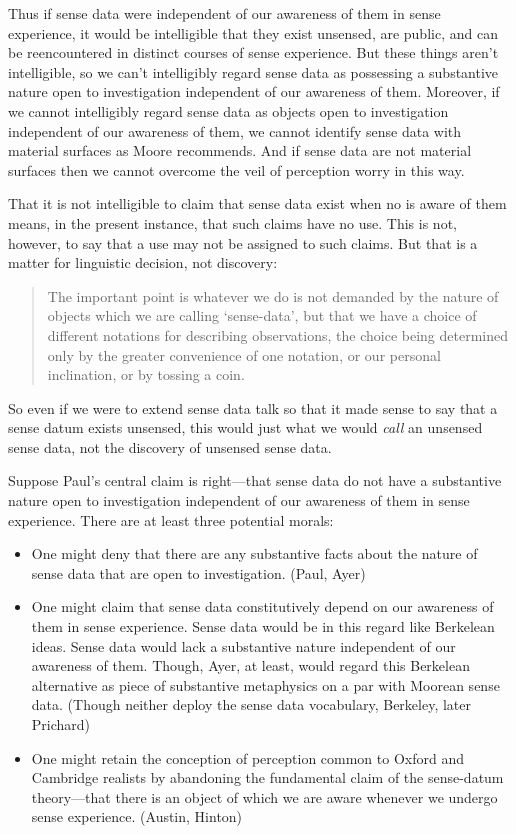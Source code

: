 Thus if sense data were independent of our awareness of them in sense experience, it would be intelligible that they exist unsensed, are public, and can be reencountered in distinct courses of sense experience. But these things aren't intelligible, so we can't intelligibly regard sense data as possessing a substantive nature open to investigation independent of our awareness of them. Moreover, if we cannot intelligibly regard sense data as objects open to investigation independent of our awareness of them, we cannot identify sense data with material surfaces as Moore recommends. And if sense data are not material surfaces then we cannot overcome the veil of perception worry in this way.

That it is not intelligible to claim that sense data exist when no is aware of them means, in the present instance, that such claims have no use. This is not, however, to say that a use may not be assigned to such claims. But that is a matter for linguistic decision, not discovery:
\begin{quote}
	The important point is whatever we do is not demanded by the nature of objects which we are calling `sense-data', but that we have a choice of different notations for describing observations, the choice being determined only by the greater convenience of one notation, or our personal inclination, or by tossing a coin.\citep[]{Paul:1936kd}
\end{quote}
So even if we were to extend sense data talk so that it made sense to say that a sense datum exists unsensed, this would just what we would \emph{call} an unsensed sense data, not the discovery of unsensed sense data.

Suppose Paul's central claim is right---that sense data do not have a substantive nature open to investigation independent of our awareness of them in sense experience. There are at least three potential morals:

\begin{itemize}
	\item One might deny that there are any substantive facts about the nature of sense data that are open to investigation. (Paul, Ayer)
	\item One might claim that sense data constitutively depend on our awareness of them in sense experience. Sense data would be in this regard like Berkelean ideas. Sense data would lack a substantive nature independent of our awareness of them. Though, Ayer, at least, would regard this Berkelean alternative as piece of substantive metaphysics on a par with Moorean sense data. (Though neither deploy the sense data vocabulary, Berkeley, later Prichard)
	\item One might retain the conception of perception common to Oxford and Cambridge realists by abandoning the fundamental claim of the sense-datum theory---that there is an object of which we are aware whenever we undergo sense experience. (Austin, Hinton)
\end{itemize}



